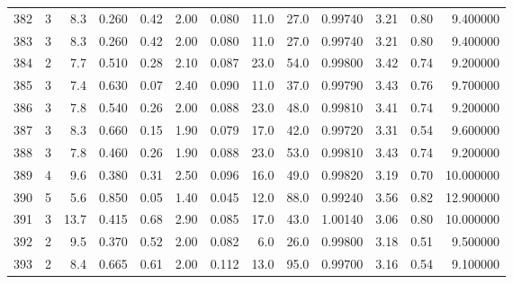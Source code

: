 \begin{tabular}{lrrrrrrrrrrrr}
382  &        3 &            8.3 &             0.260 &         0.42 &            2.00 &      0.080 &                 11.0 &                  27.0 &  0.99740 &  3.21 &       0.80 &   9.400000 \\
383  &        3 &            8.3 &             0.260 &         0.42 &            2.00 &      0.080 &                 11.0 &                  27.0 &  0.99740 &  3.21 &       0.80 &   9.400000 \\
384  &        2 &            7.7 &             0.510 &         0.28 &            2.10 &      0.087 &                 23.0 &                  54.0 &  0.99800 &  3.42 &       0.74 &   9.200000 \\
385  &        3 &            7.4 &             0.630 &         0.07 &            2.40 &      0.090 &                 11.0 &                  37.0 &  0.99790 &  3.43 &       0.76 &   9.700000 \\
386  &        3 &            7.8 &             0.540 &         0.26 &            2.00 &      0.088 &                 23.0 &                  48.0 &  0.99810 &  3.41 &       0.74 &   9.200000 \\
387  &        3 &            8.3 &             0.660 &         0.15 &            1.90 &      0.079 &                 17.0 &                  42.0 &  0.99720 &  3.31 &       0.54 &   9.600000 \\
388  &        3 &            7.8 &             0.460 &         0.26 &            1.90 &      0.088 &                 23.0 &                  53.0 &  0.99810 &  3.43 &       0.74 &   9.200000 \\
389  &        4 &            9.6 &             0.380 &         0.31 &            2.50 &      0.096 &                 16.0 &                  49.0 &  0.99820 &  3.19 &       0.70 &  10.000000 \\
390  &        5 &            5.6 &             0.850 &         0.05 &            1.40 &      0.045 &                 12.0 &                  88.0 &  0.99240 &  3.56 &       0.82 &  12.900000 \\
391  &        3 &           13.7 &             0.415 &         0.68 &            2.90 &      0.085 &                 17.0 &                  43.0 &  1.00140 &  3.06 &       0.80 &  10.000000 \\
392  &        2 &            9.5 &             0.370 &         0.52 &            2.00 &      0.082 &                  6.0 &                  26.0 &  0.99800 &  3.18 &       0.51 &   9.500000 \\
393  &        2 &            8.4 &             0.665 &         0.61 &            2.00 &      0.112 &                 13.0 &                  95.0 &  0.99700 &  3.16 &       0.54 &   9.100000 \\

\end{tabular}
